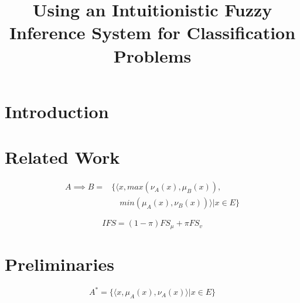 \documentclass[conference]{IEEEtran}
\begin{document}
\title{Using an Intuitionistic Fuzzy Inference System for
Classification Problems}

\author{
  }

\maketitle

\begin{abstract}

\end{abstract}

\IEEEpeerreviewmaketitle

\section{Introduction}
\label{introduction}

\section{Related Work}
\label{related-work}

\begin{equation}
  \label{ifs-implication}
  \begin{aligned}
  A \implies B = & \{ \langle x, max(\nu_{A} (x), \mu_{B}(x)),\\
  &\quad min(\mu_{A} (x), \nu_{B} (x)) \rangle | x \in E \}
\end{aligned}
\end{equation}

\begin{equation}
  \label{linear-combination}
  IFS = (1-\pi)FS_{\mu} + \pi FS_{v}
\end{equation}

\section{Preliminaries}
\label{preliminaries}

\begin{equation}
  \label{ifs-definition}
  A^{*} = \{\langle x, \mu _{A} (x), \nu _{A} (x) \rangle | x \in E\}
\end{equation}
\end{document}
